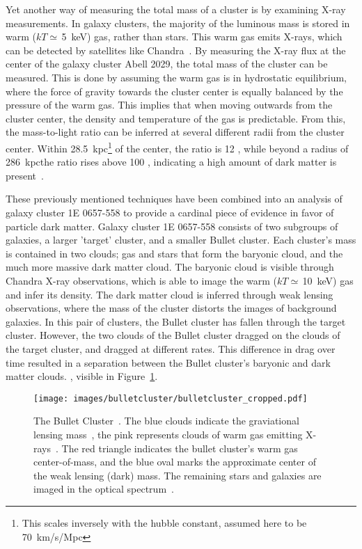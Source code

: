 Yet another way of measuring the total mass of a cluster is by examining X-ray measurements.
In galaxy clusters, the majority of the luminous mass is stored in warm ($kT\simeq\,$\SI{5}{keV}) gas, rather than stars.
This warm gas emits X-rays, which can be detected by satellites like Chandra~\cite{chandra}.
By measuring the X-ray flux at the center of the galaxy cluster Abell 2029, the total mass of the cluster can be measured.
This is done by assuming the warm gas is in hydrostatic equilibrium, where the force of gravity towards the cluster center is equally balanced by the pressure of the warm gas.
This implies that when moving outwards from the cluster center, the density and temperature of the gas is predictable.
From this, the mass-to-light ratio can be inferred at several different radii from the cluster center.
Within \SI{28.5}{kpc}\footnote[2]{This scales inversely with the hubble constant, assumed here to be \SI{70}{km/s/Mpc}} of the center, the ratio is 12 \MLsol, while beyond a radius of \SI{286}{kpc}\footnotemark[2] the ratio rises above 100 \MLsol{}, indicating a high amount of dark matter is present~\cite{cluster_chandra}.

These previously mentioned techniques have been combined into an analysis of galaxy cluster 1E 0657-558 to provide a cardinal piece of evidence in favor of particle dark matter.
Galaxy cluster 1E 0657-558 consists of two subgroups of galaxies, a larger 'target' cluster, and a smaller Bullet cluster.
Each cluster's mass is contained in two clouds; gas and stars that form the baryonic cloud, and the much more massive dark matter cloud.
The baryonic cloud is visible through Chandra X-ray observations, which is able to image the warm ($kT\simeq\,$\SI{10}{keV}) gas and infer its density.
The dark matter cloud is inferred through weak lensing observations, where the mass of the cluster distorts the images of background galaxies.
In this pair of clusters, the Bullet cluster has fallen through the target cluster.
However, the two clouds of the Bullet cluster dragged on the clouds of the target cluster, and dragged at different rates.
This difference in drag over time resulted in a separation between the Bullet cluster's baryonic and dark matter clouds.
, visible in Figure~\ref{fig:bullet}.

\begin{figure}[ht]
  \centering
  \texttt{[image: images/bulletcluster/bulletcluster\_cropped.pdf]}
  \caption[The Bullet Cluster]{
    The Bullet Cluster~\cite{bullet_cluster_combined_image}.
    The blue clouds indicate the graviational lensing mass~\cite{bullet_cluster}, the pink represents clouds of warm gas emitting X-rays~\cite{bullet_cluster_chandramap}.
    The red triangle indicates the bullet cluster's warm gas center-of-mass, and the blue oval marks the approximate center of the weak lensing (dark) mass.
    The remaining stars and galaxies are imaged in the optical spectrum~\cite{bullet_cluster_composite}.}
  \label{fig:bullet}
\end{figure}
    

